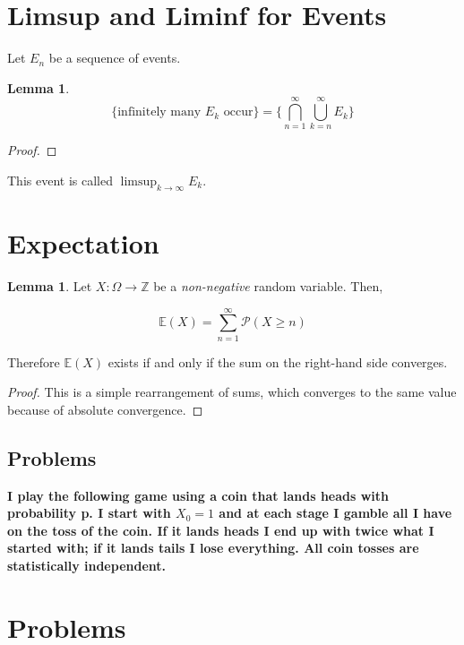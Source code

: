 \documentclass{article}
\theoremstyle{definition}
\newtheorem{lemma}[theorem]{Lemma}
\newcommand{\Z}{\mathbb{Z}}
\newcommand{\Prob}{\mathcal{P}}
\newcommand{\expect}{\mathbb{E}}
\begin{document}
\newpage

\section{Limsup and Liminf for Events}

Let $E_{n}$ be a sequence of events.

\begin{lemma}
    \[\{ \text{infinitely many $E_{k}$ occur}\} = \{ \bigcap_{n = 1}^{\infty} \bigcup_{k = n}^{\infty} E_{k}\}\]
\end{lemma}
\begin{proof}
    
\end{proof}

This event is called $\limsup_{k \to \infty}E_{k}$.



\newpage

\section{Expectation}

\begin{lemma}
    Let $X: \Omega \xrightarrow{} \Z$ be a \textit{non-negative} random variable. Then,

    \[  \expect(X) = \sum_{n = 1}^{\infty} \Prob(X \geq n) \]

    Therefore $\expect(X)$ exists if and only if the sum on the right-hand side converges.
\end{lemma}
\begin{proof}
    This is a simple rearrangement of sums, which converges to the same value because of absolute convergence.
\end{proof}

\subsection{Problems}

\textbf{I play the following game using a coin that lands heads with probability p. I
start with $X_{0} = 1$ and at each stage I gamble all I have on the toss of the coin.
If it lands heads I end up with twice what I started with; if it lands tails I lose
everything. All coin tosses are statistically independent.}

\newpage

\section{Problems}
\end{document}
